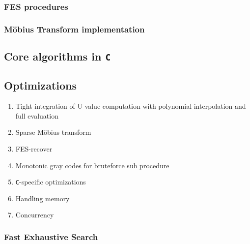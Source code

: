 \subsubsection{FES procedures}

\subsubsection{Möbius Transform implementation}

\subsection{Core algorithms in \texttt{C}} \label{sec:impl:c}


\subsection{Optimizations}

\begin{enumerate}
    \item Tight integration of U-value computation with polynomial interpolation and full evaluation
    \item Sparse Möbius transform
    \item FES-recover
    \item Monotonic gray codes for bruteforce sub procedure
    \item \texttt{C}-specific optimizations
    \item Handling memory
    \item Concurrency
\end{enumerate}

\subsubsection{Fast Exhaustive Search}

